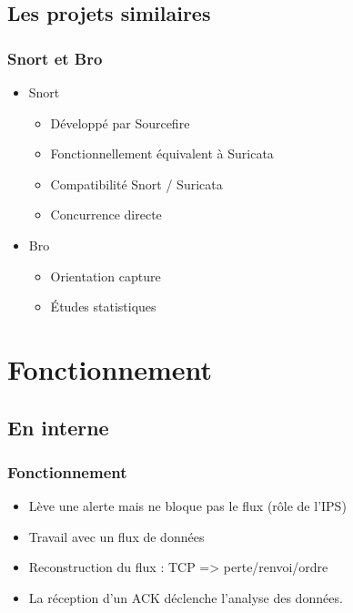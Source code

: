 \documentclass{beamer}
\begin{document}
\subsection{Les projets similaires}
\begin{frame}
\frametitle{Snort et Bro}
\begin{itemize}
[triangle]
\item Snort
\begin{itemize}
\item Développé par Sourcefire
\item Fonctionnellement équivalent à Suricata
\item Compatibilité Snort / Suricata
\item Concurrence directe
\end{itemize}
\pause
\item Bro
\begin{itemize}
\item Orientation capture
\item Études statistiques
\end{itemize}
\end{itemize}
\end{frame}

\section{Fonctionnement}
\subsection{En interne}
\begin{frame}
\frametitle{Fonctionnement}
\begin{itemize}
[triangle]
\item Lève une alerte mais ne bloque pas le flux (rôle de l'IPS)
\item Travail avec un flux de données
\item Reconstruction du flux : TCP => perte/renvoi/ordre
\item La réception d'un ACK déclenche l'analyse des données.
\end{itemize}
\begin{center}
\end{center}
\end{frame}

\end{document}
